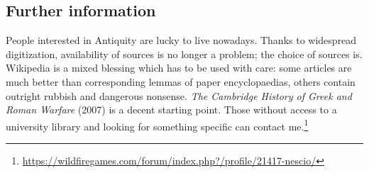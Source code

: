 \documentclass{article}
\begin{document}
\begin{comment}
\subsection{More factions (not implemented)}
  Add more factions to cover the 8th, 7th, 6h and the 2nd and 1st centuries B.C. (existing factions are indicated with an asterisk (*)):

Armenians (Greater Armenia, 331~BC--428~AD, peaked first half 1st C. BC)
Assyrians (Neo-Assyrian Empire, 911--612), 
Attalids (Pergamon, 282--133),
Britons*,
Carthaginians* (814--146),
Chaldeans (Neo-Babylonian Empire, 626--539),
Epirus (330--167), 
Etruscans (768--264),
Gauls*,
Greeks (c.800--146; subdivided into four factions: Athenians/Athens*, Boeotians/Thebes, Lacedaemonians/Sparta*, and Sicilians/Syracusae)\footnote{Other important local powers included Argos, Milete, and Samos peaking in the Archaic period, Corinth, and Tarentum in the Classical period, and the Acarnanians and Aetolians, Achaeans, and Rhodians peaking in the Hellenistic period.},
Iberians*,
Illyrians,
Lydians (unclear--546),
Macedonians* (Macedon, 808--168, peaked 323), 
Mauryas* (India, 326--180),
Nubians (Kush (Napata, Meroe), 1070~BC--350~AD, peaked c.700 BC),
Numidia (202--40),
Parthians (Arsacid Empire, 247~BC--224~AD, peaked middle 2nd C. BC),
Persians* (Achaemenid Empire, c.550--330),
Phrygians (c.800--c.600),
Pontus (281~BC--66~BC/62~AD, peaked first half 1st C. BC),
Ptolemies* (Egypt, 305--30),
Romans* (Roman Republic, 509--27),
Scythians,
Seleucids* (Syria, 312--63),
Thracians,
Urartu (Armenia, 860--590).
\end{comment}

\subsection{Further information}
People interested in Antiquity are lucky to live nowadays. Thanks to widespread digitization, availability of sources is no longer a problem; the choice of sources is. 
Wikipedia is a mixed blessing which has to be used with care: some articles are much better than corresponding lemmas of paper encyclopaedias, others contain outright rubbish and dangerous nonsense.
\textit{The Cambridge History of Greek and Roman Warfare} (2007) is a decent starting point.
Those without access to a university library and looking for something specific can contact me.\footnote{\url{https://wildfiregames.com/forum/index.php?/profile/21417-nescio/}}
\end{document}
